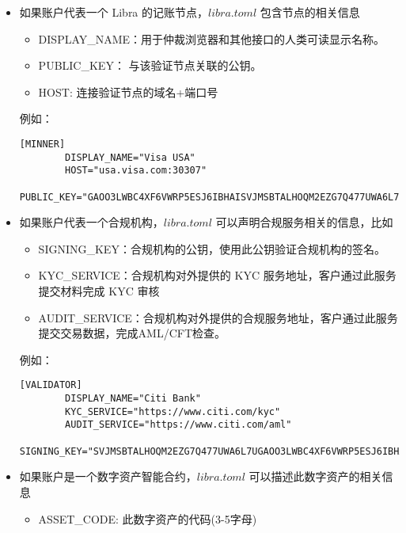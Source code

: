 \begin{itemize}
    \item 如果账户代表一个 Libra 的记账节点，$libra.toml$ 包含节点的相关信息
        \begin{itemize}
            \item DISPLAY\_NAME：用于仲裁浏览器和其他接口的人类可读显示名称。
            \item PUBLIC\_KEY： 与该验证节点关联的公钥。
            \item HOST: 连接验证节点的域名+端口号
        \end{itemize}
        例如：
        \begin{lstlisting}[caption={记账节点配置信息}, label={lst:validator}]
        [MINNER]
        DISPLAY_NAME="Visa USA"
        HOST="usa.visa.com:30307"
        PUBLIC_KEY="GAOO3LWBC4XF6VWRP5ESJ6IBHAISVJMSBTALHOQM2EZG7Q477UWA6L7U"
        \end{lstlisting}
        
    \item 如果账户代表一个合规机构，$libra.toml$ 可以声明合规服务相关的信息，比如
        \begin{itemize}
            \item SIGNING\_KEY：合规机构的公钥，使用此公钥验证合规机构的签名。
            
            \item KYC\_SERVICE：合规机构对外提供的 KYC 服务地址，客户通过此服务提交材料完成 KYC 审核

            \item AUDIT\_SERVICE：合规机构对外提供的合规服务地址，客户通过此服务提交交易数据，完成AML/CFT检查。

        \end{itemize}
        例如：
        \begin{lstlisting}[caption={验证机构配置信息}, label={lst:validator}]
        [VALIDATOR]
        DISPLAY_NAME="Citi Bank"
        KYC_SERVICE="https://www.citi.com/kyc"
        AUDIT_SERVICE="https://www.citi.com/aml"
        SIGNING_KEY="SVJMSBTALHOQM2EZG7Q477UWA6L7UGAOO3LWBC4XF6VWRP5ESJ6IBHAI"
        \end{lstlisting}

    \item 如果账户是一个数字资产智能合约，$libra.toml$ 可以描述此数字资产的相关信息
        \begin{itemize}
            \item ASSET\_CODE: 此数字资产的代码(3-5字母)
            

\end{itemize}
\end{itemize}
